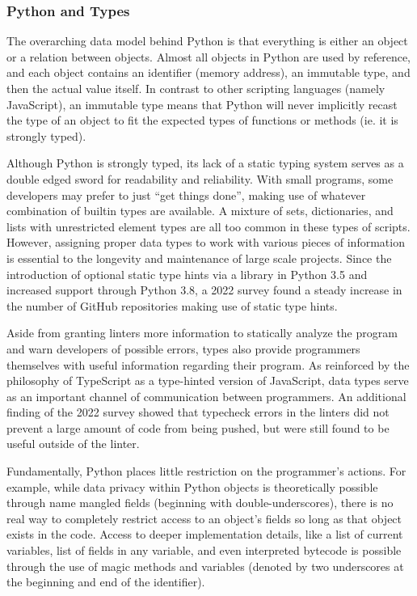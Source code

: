 \documentclass{article}
\begin{document}
\subsubsection{Python and Types}

The overarching data model behind Python is that everything is either an object or a relation between objects.
Almost all objects in Python are used by reference, and each object contains an identifier (memory address),
an immutable type, and then the actual value itself. In contrast to other scripting languages (namely JavaScript),
an immutable type means that Python will never implicitly recast the type of an object to fit the expected types
of functions or methods (ie. it is strongly typed).


Although Python is strongly typed, its lack of a static typing system serves as a double edged sword for
readability and reliability. With small programs, some developers may prefer to just ``get things done'',
making use of whatever combination of builtin types are available.
A mixture of sets, dictionaries, and lists with unrestricted element types are all too common in these types of scripts.
However, assigning proper data types to work with various pieces of information is essential
to the longevity and maintenance of large scale projects. Since the introduction of optional static type hints
via a library in Python 3.5 and increased support through Python 3.8,
a 2022 survey \cite{empiricalTypePython} found a steady increase in the number of GitHub repositories
making use of static type hints.

Aside from granting linters more information to statically analyze the program and warn developers of possible errors,
types also provide programmers themselves with useful information regarding their program. As reinforced
by the philosophy of TypeScript as a type-hinted version of JavaScript, data types serve as an important
channel of communication between programmers. An additional finding of the 2022 survey \cite{empiricalTypePython}
showed that typecheck errors in the linters did not prevent a large amount of code from being pushed, but were
still found to be useful outside of the linter.

Fundamentally, Python places little restriction on the programmer's actions. For example, while
data privacy within Python objects is theoretically possible through name mangled fields (beginning with double-underscores),
there is no real way to completely restrict access to an object's fields so long as that object exists in the code.
Access to deeper implementation details, like a list of current variables, list of fields in any variable, and even
interpreted bytecode is possible through the use of magic methods and variables
(denoted by two underscores at the beginning and end of the identifier).
\end{document}
